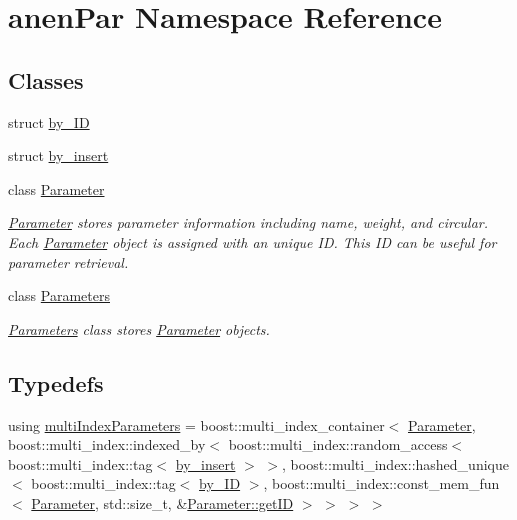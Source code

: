 \hypertarget{namespaceanen_par}{}\section{anen\+Par Namespace Reference}
\label{namespaceanen_par}
\subsection*{Classes}
\begin{DoxyCompactItemize}
\item 
struct \mbox{\hyperlink{structanen_par_1_1by___i_d}{by\+\_\+\+ID}}
\item 
struct \mbox{\hyperlink{structanen_par_1_1by__insert}{by\+\_\+insert}}
\item 
class \mbox{\hyperlink{classanen_par_1_1_parameter}{Parameter}}
\begin{DoxyCompactList}\small\item\em \mbox{\hyperlink{classanen_par_1_1_parameter}{Parameter}} stores parameter information including name, weight, and circular. Each \mbox{\hyperlink{classanen_par_1_1_parameter}{Parameter}} object is assigned with an unique ID. This ID can be useful for parameter retrieval. \end{DoxyCompactList}\item 
class \mbox{\hyperlink{classanen_par_1_1_parameters}{Parameters}}
\begin{DoxyCompactList}\small\item\em \mbox{\hyperlink{classanen_par_1_1_parameters}{Parameters}} class stores \mbox{\hyperlink{classanen_par_1_1_parameter}{Parameter}} objects. \end{DoxyCompactList}\end{DoxyCompactItemize}
\subsection*{Typedefs}
\begin{DoxyCompactItemize}
\item 
using \mbox{\hyperlink{namespaceanen_par_a80347e56535f3553dead0c9515dbecd6}{multi\+Index\+Parameters}} = boost\+::multi\+\_\+index\+\_\+container$<$ \mbox{\hyperlink{classanen_par_1_1_parameter}{Parameter}}, boost\+::multi\+\_\+index\+::indexed\+\_\+by$<$ boost\+::multi\+\_\+index\+::random\+\_\+access$<$ boost\+::multi\+\_\+index\+::tag$<$ \mbox{\hyperlink{structanen_par_1_1by__insert}{by\+\_\+insert}} $>$ $>$, boost\+::multi\+\_\+index\+::hashed\+\_\+unique$<$ boost\+::multi\+\_\+index\+::tag$<$ \mbox{\hyperlink{structanen_par_1_1by___i_d}{by\+\_\+\+ID}} $>$, boost\+::multi\+\_\+index\+::const\+\_\+mem\+\_\+fun$<$ \mbox{\hyperlink{classanen_par_1_1_parameter}{Parameter}}, std\+::size\+\_\+t, \&\mbox{\hyperlink{classanen_par_1_1_parameter_a12c2b322265422eea431043dd50f047d}{Parameter\+::get\+ID}} $>$ $>$ $>$ $>$
\end{DoxyCompactItemize}
